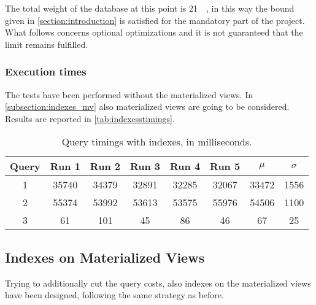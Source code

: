 The total weight of the database at this point is \SI{21}{\giga\byte}, in this way the bound given in \autoref{section:introduction} is satisfied for the mandatory part of the project. What follows concerns optional optimizations and it is not guaranteed that the limit remains fulfilled.

\subsubsection{Execution times}

The tests have been performed without the materialized views. In \autoref{subsection:indexes_mv} also materialized views are going to be considered. Results are reported in \autoref{tab:indexesstimings}.

\begin{table}[h!]
\centering
\begin{tabular}{|| c | c c c c c | c c ||} 
 \hline
 Query & Run 1 & Run 2 & Run 3 & Run 4 & Run 5 & 	$\mu$ & $\sigma$ \\ [0.5ex] 
 \hline\hline
 1 & 35740 & 34379 & 32891 & 32285 & 32067 & 33472 & 1556 \\ 
 \hline
 2 & 55374 & 53992 & 53613 & 53575 & 55976 & 54506 & 1100 \\
 \hline
 3 & 61 & 101 & 45 & 86 & 46 & 67 & 25 \\
 \hline
\end{tabular}
  \caption{Query timings with indexes, in milliseconds.}
  \label{tab:indexesstimings}
\end{table}

\subsection{Indexes on Materialized Views}\label{subsection:indexes_mv}
Trying to additionally cut the query costs, also indexes on the materialized views have been designed, following the same strategy as before.

